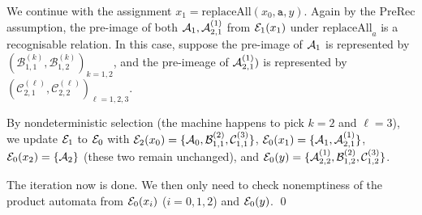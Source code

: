 {\begin{example}
		We continue with the assignment $x_1 = \text{replaceAll}(x_0,\texttt{a},y)$. Again by the PreRec assumption, the pre-image of both $\mathcal{A}_1,\mathcal{A}^{(1)}_{2,1}$ from $\mathcal{E}_1(x_1)$ under  $\text{replaceAll}_a$ is a recognisable relation. In this case, suppose 
		the pre-image of $\mathcal{A}_1$ is represented by $(\mathcal{B}^{(k)}_{1, 1}, \mathcal{B}^{(k)}_{1, 2})_{k = 1,2}$, and the pre-imeage of $\mathcal{A}^{(1)}_{2,1})$ is represented by $( \mathcal{C}^{(\ell)}_{2, 1}, \mathcal{C}^{(\ell)}_{2, 2})_{ \ell=1,2,3}$. 
		
		
		By nondeterministic selection (the machine happens to pick $k=2$ and $\ell=3$), we update $\mathcal{E}_1$ to $\mathcal{E}_0$ with $\mathcal{E}_2(x_0)=\{\mathcal{A}_0, \mathcal{B}^{(2)}_{1,1}, \mathcal{C}^{(3)}_{1,1}\}$, $\mathcal{E}_0(x_1)=\{\mathcal{A}_1,\mathcal{A}^{(1)}_{2,1}\}$, $\mathcal{E}_0(x_2)=\{\mathcal{A}_2\}$ (these two remain unchanged), and $\mathcal{E}_0(y)=\{\mathcal{A}^{(1)}_{2,2}, \mathcal{B}^{(2)}_{1,2},  \mathcal{C}^{(3)}_{1,2}\}$.
		
		The iteration now is done. We then only need to check nonemptiness of the product automata from $\mathcal{E}_0(x_i)$ ($i=0,1,2$) and $\mathcal{E}_0(y)$. \qed
\end{example}

}
